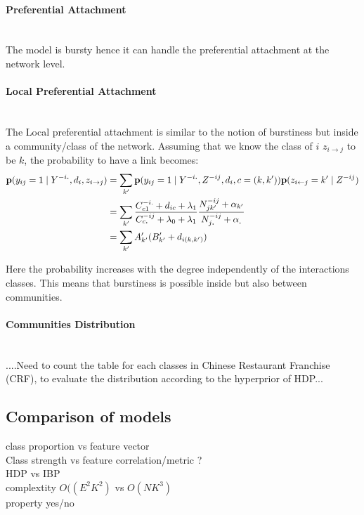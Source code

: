 \paragraph{Preferential Attachment}~\\

The model is bursty hence it can handle the preferential attachment at the network level.

\paragraph{Local Preferential Attachment}~\\

The Local preferential attachment is similar to the notion of burstiness but inside a community/class of the network. Assuming that we know the class of $i$ $z_{i\rightarrow j}$ to be $k$, the probability to have a link becomes: 
\begin{align}
\mathbf{p}(y_{ij}=1 \mid Y^{-i\bm{.}}, d_i,z_{i\rightarrow j})  &= \sum_{k'} \mathbf{p}(y_{ij}=1 \mid Y^{-i\bm{.}}, Z^{-ij}, d_i , c=(k,k')) \mathbf{p}(z_{i\leftarrow j}=k' \mid Z^{-ij} ) \\
&= \sum_{k'} \frac{C_{c1}^{-i.} + d_{ic} + \lambda_1}{C_{c\bm{.}}^{-ij} + \lambda_0 + \lambda_1} \frac{N_{jk'}^{-ij} + \alpha_{k'}}{ N_{j\bm{.}}^{-ij} + \alpha_{\bm{.}} } \\
&= \sum_{k'} A'_{k'} (B'_{k'} + d_{i(k,k')})
\end{align}

Here the probability increases with the degree independently of the interactions classes. This means that burstiness is possible inside but also between communities.

\paragraph{Communities Distribution}~\\

....Need to count the table for each classes in Chinese Restaurant Franchise (CRF), to evaluate the distribution according to the hyperprior of HDP...


\subsection{Comparison of models}
class proportion vs feature vector \\
Class strength vs feature correlation/metric ? \\
HDP vs IBP \\
complextity $O((E^2K^2)$ vs $O(NK^3)$ \\
property yes/no

